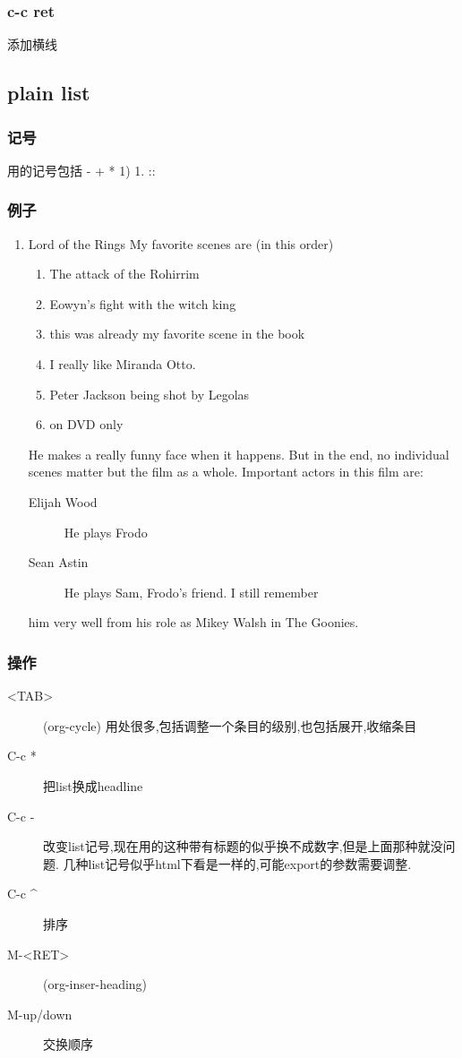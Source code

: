 \documentclass[12pt,a4paper]{article}
\begin{document}
\subsubsection{c-c ret}
\label{sec:orgheadline69}
添加横线

\subsection{plain list}
\label{sec:orgheadline75}

\subsubsection{记号}
\label{sec:orgheadline71}
用的记号包括 - + *  1) 1. ::
\subsubsection{例子}
\label{sec:orgheadline73}
\begin{enumerate}
\item Lord of the Rings
\label{sec:orgheadline72}
My favorite scenes are (in this order)
\begin{enumerate}
\item The attack of the Rohirrim
\item Eowyn's fight with the witch king
\item this was already my favorite scene in the book
\item I really like Miranda Otto.
\item Peter Jackson being shot by Legolas
\item on DVD only
\end{enumerate}
He makes a really funny face when it happens.
But in the end, no individual scenes matter but the film as a whole.
Important actors in this film are:
\begin{description}
\item[{Elijah Wood}] He plays Frodo
\item[{Sean Astin}] He plays Sam, Frodo's friend.  I still remember
\end{description}
him very well from his role as Mikey Walsh in The Goonies.
\end{enumerate}
\subsubsection{操作}
\label{sec:orgheadline74}
\begin{description}
\item[{<TAB>}] (org-cycle) 用处很多,包括调整一个条目的级别,也包括展开,收缩条目
\item[{C-c *}] 把list换成headline
\item[{C-c -}] 改变list记号,现在用的这种带有标题的似乎换不成数字,但是上面那种就没问题. 几种list记号似乎html下看是一样的,可能export的参数需要调整.
\item[{C-c \^{}}] 排序
\item[{M-<RET>}] (org-inser-heading)
\item[{M-up/down}] 交换顺序
\end{description}
\end{document}
